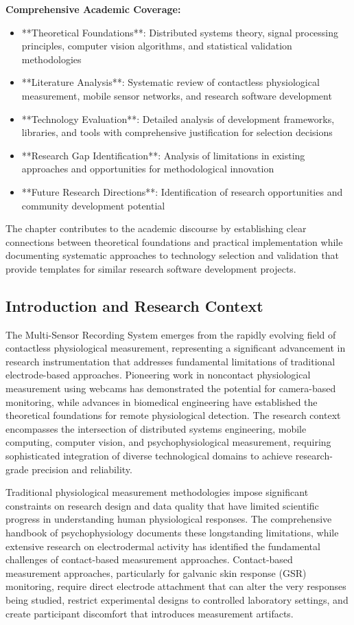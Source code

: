 \documentclass[11pt,a4paper]{article}
\begin{document}
\textbf{Comprehensive Academic Coverage:}

\begin{itemize}
\item **Theoretical Foundations**: Distributed systems theory, signal processing principles, computer vision algorithms, and
  statistical validation methodologies
\item **Literature Analysis**: Systematic review of contactless physiological measurement, mobile sensor networks, and
  research software development
\item **Technology Evaluation**: Detailed analysis of development frameworks, libraries, and tools with comprehensive
  justification for selection decisions
\item **Research Gap Identification**: Analysis of limitations in existing approaches and opportunities for methodological
  innovation
\item **Future Research Directions**: Identification of research opportunities and community development potential

\end{itemize}
The chapter contributes to the academic discourse by establishing clear connections between theoretical foundations and
practical implementation while documenting systematic approaches to technology selection and validation that provide
templates for similar research software development projects.

\subsection{Introduction and Research Context}

The Multi-Sensor Recording System emerges from the rapidly evolving field of contactless physiological measurement,
representing a significant advancement in research instrumentation that addresses fundamental limitations of traditional
electrode-based approaches. Pioneering work in noncontact physiological measurement using webcams has demonstrated the
potential for camera-based monitoring, while advances in biomedical engineering have established the theoretical
foundations for remote physiological detection. The research context encompasses the intersection of distributed systems
engineering, mobile computing, computer vision, and psychophysiological measurement, requiring sophisticated integration
of diverse technological domains to achieve research-grade precision and reliability.

Traditional physiological measurement methodologies impose significant constraints on research design and data quality
that have limited scientific progress in understanding human physiological responses. The comprehensive handbook of
psychophysiology documents these longstanding limitations, while extensive research on electrodermal activity has
identified the fundamental challenges of contact-based measurement approaches. Contact-based measurement approaches,
particularly for galvanic skin response (GSR) monitoring, require direct electrode attachment that can alter the very
responses being studied, restrict experimental designs to controlled laboratory settings, and create participant
discomfort that introduces measurement artifacts.
\end{document}
